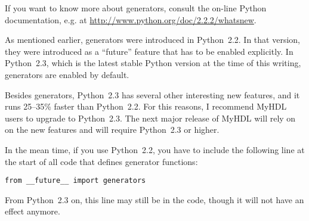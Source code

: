 If you want to know more about generators, consult the on-line Python
documentation, e.g. at \url{http://www.python.org/doc/2.2.2/whatsnew}. 

\begin{notice}[warning]
As mentioned earlier, generators were introduced in Python~2.2. In
that version, they were introduced as a ``future'' feature that has to
be enabled explicitly. In Python~2.3, which is the latest stable
Python version at the time of this writing, generators are enabled by
default.

Besides generators, Python~2.3 has several other interesting new
features, and it runs 25--35\% faster than Python~2.2. For this
reasons, I recommend MyHDL users to upgrade to Python~2.3. The next
major release of MyHDL will rely on on the new features and will
require Python~2.3 or higher.

In the mean time, if you use Python~2.2, you have to include the
following line at the start of all code that defines generator
functions:

\begin{verbatim}
from __future__ import generators
\end{verbatim}

From Python~2.3 on, this line may still be in the code, though it will
not have an effect anymore.
\end{notice}

